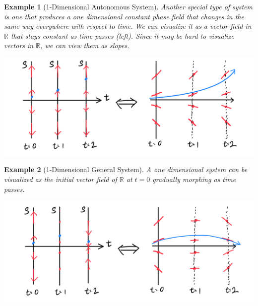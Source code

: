 \documentclass{article}
\newtheorem{example}{Example}[section]
\theoremstyle{remark}
\theoremstyle{definition}
\begin{document}
    \begin{example}[1-Dimensional Autonomous System]
    Another special type of system is one that produces a one dimensional \textit{constant} phase field that changes in the same way everywhere with respect to time. We can visualize it as a vector field in $\mathbb{R}$ that stays constant as time passes (left). Since it may be hard to visualize vectors in $\mathbb{R}$, we can view them as slopes. 
    \begin{center}
        \includegraphics[scale=0.25]{img/One_dim_auto_system.PNG}
    \end{center}
    \end{example}

    \begin{example}[1-Dimensional General System]
    A one dimensional system can be visualized as the initial vector field of $\mathbb{R}$ at $t=0$ gradually morphing as time passes. 
    \begin{center}
        \includegraphics[scale=0.25]{img/One_dim_general_system.PNG}
    \end{center}
    \end{example}
\end{document}
